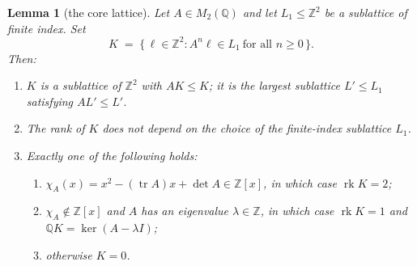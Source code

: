 \documentclass[12pt]{article}
\newtheorem{lemma}[theorem]{Lemma}
\theoremstyle{definition}
\begin{document}
\begin{lemma}[the core lattice]\label{lemma:core-lattice}
Let $A\in M_2(\mathbb{Q})$ and let $L_1\le\mathbb{Z}^2$ be a sublattice
of finite index. Set
\[
K \;=\; \{\,\ell\in\mathbb{Z}^2 : A^n\ell\in L_1 \ \text{for all }
n\ge 0\,\}.
\]
Then:
\begin{enumerate}
\item[(a)] $K$ is a sublattice of $\mathbb{Z}^2$ with $AK\le K$; it is
the largest sublattice $L'\le L_1$ satisfying $AL'\le L'$.
\item[(b)] The rank of $K$ does not depend on the choice of the
finite-index sublattice $L_1$.
\item[(c)] Exactly one of the following holds:
\begin{enumerate}
\item[(i)] $\chi_A(x)=x^2-(\operatorname{tr}A)x+\det A\in\mathbb{Z}[x]$,
in which case $\operatorname{rk}K=2$;
\item[(ii)] $\chi_A\notin\mathbb{Z}[x]$ and $A$ has an eigenvalue
$\lambda\in\mathbb{Z}$, in which case $\operatorname{rk}K=1$ and
$\mathbb{Q}K=\ker(A-\lambda I)$;
\item[(iii)] otherwise $K=0$.
\end{enumerate}
\end{enumerate}
\end{lemma}
\end{document}
